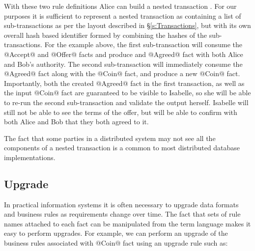 With these two rule definitions Alice can build a nested transaction \CITE. For our purposes it is sufficient to represent a nested transaction as containing a list of sub-transactions as per the layout described in \S\ref{s:Transactions}, but with its own overall hash based identifier formed by combining the hashes of the sub-transactions. For the example above, the first sub-transaction will consume the @Accept@ and @Offer@ facts and produce and @Agreed@ fact with both Alice and Bob's authority. The second sub-transaction will immediately consume the @Agreed@ fact along with the @Coin@ fact, and produce a new @Coin@ fact. Importantly, both the created @Agreed@ fact in the first transaction, as well as the input @Coin@ fact are guaranteed to be visible to Isabelle, so she will be able to re-run the second sub-transaction and validate the output herself. Isabelle will still not be able to see the terms of the offer, but will be able to confirm with both Alice and Bob that they both agreed to it.

The fact that some parties in a distributed system may not see all the components of a nested transaction is a common to most distributed database implementations.



\eject{}
\subsection{Upgrade}
In practical information systems it is often necessary to upgrade data formats and business rules as requirements change over time. The fact that sets of rule names attached to each fact can be manipulated from the term language makes it easy to perform upgrades. For example, we can perform an upgrade of the business rules associated with @Coin@ fact using an upgrade rule such as:

